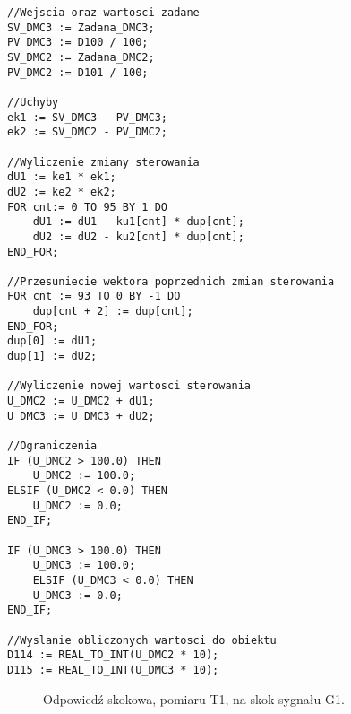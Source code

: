 \begin{lstlisting}[style=customlatex,frame=single, caption=Kod regulatora DMC, label=lst:dmc]
//Wejscia oraz wartosci zadane
SV_DMC3 := Zadana_DMC3;
PV_DMC3 := D100 / 100;
SV_DMC2 := Zadana_DMC2;
PV_DMC2 := D101 / 100;

//Uchyby
ek1 := SV_DMC3 - PV_DMC3;
ek2 := SV_DMC2 - PV_DMC2;

//Wyliczenie zmiany sterowania
dU1 := ke1 * ek1;
dU2 := ke2 * ek2;
FOR cnt:= 0 TO 95 BY 1 DO
	dU1 := dU1 - ku1[cnt] * dup[cnt];
	dU2 := dU2 - ku2[cnt] * dup[cnt];
END_FOR;

//Przesuniecie wektora poprzednich zmian sterowania
FOR cnt := 93 TO 0 BY -1 DO
	dup[cnt + 2] := dup[cnt];
END_FOR;
dup[0] := dU1;
dup[1] := dU2;

//Wyliczenie nowej wartosci sterowania
U_DMC2 := U_DMC2 + dU1;
U_DMC3 := U_DMC3 + dU2;

//Ograniczenia
IF (U_DMC2 > 100.0) THEN
	U_DMC2 := 100.0;
ELSIF (U_DMC2 < 0.0) THEN
	U_DMC2 := 0.0;
END_IF;

IF (U_DMC3 > 100.0) THEN
	U_DMC3 := 100.0;
	ELSIF (U_DMC3 < 0.0) THEN
	U_DMC3 := 0.0;
END_IF;

//Wyslanie obliczonych wartosci do obiektu
D114 := REAL_TO_INT(U_DMC2 * 10);
D115 := REAL_TO_INT(U_DMC3 * 10);
\end{lstlisting}

\begin{figure}[tb]
\centering
{}
\caption{Odpowiedź skokowa, pomiaru T1, na skok sygnału G1.}
\label{fig:s11}
\end{figure}

